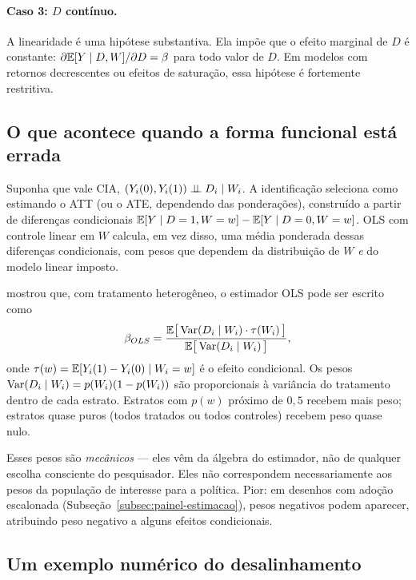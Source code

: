 \paragraph{Caso 3: $D$ contínuo.} A linearidade é uma hipótese substantiva. Ela impõe que o efeito marginal de $D$ é constante: $\partial \mathbb{E}[Y \mid D, W] / \partial D = \beta$ para todo valor de $D$. Em modelos com retornos decrescentes ou efeitos de saturação, essa hipótese é fortemente restritiva.

\subsection*{O que acontece quando a forma funcional está errada}

Suponha que vale CIA, $(Y_i(0), Y_i(1)) \perp\!\!\!\perp D_i \mid W_i$. A identificação seleciona como estimando o ATT (ou o ATE, dependendo das ponderações), construído a partir de diferenças condicionais $\mathbb{E}[Y \mid D=1, W=w] - \mathbb{E}[Y \mid D=0, W=w]$. OLS com controle linear em $W$ calcula, em vez disso, uma média ponderada dessas diferenças condicionais, com pesos que dependem da distribuição de $W$ \textit{e} do modelo linear imposto.

\citet{Angrist1998} mostrou que, com tratamento heterogêneo, o estimador OLS pode ser escrito como
\begin{equation}
\beta_{OLS} = \frac{\mathbb{E}\big[\,\mathrm{Var}(D_i \mid W_i) \cdot \tau(W_i)\,\big]}{\mathbb{E}\big[\,\mathrm{Var}(D_i \mid W_i)\,\big]},
\label{eq:angrist-pesos}
\end{equation}
onde $\tau(w) = \mathbb{E}[Y_i(1) - Y_i(0) \mid W_i = w]$ é o efeito condicional. Os pesos $\mathrm{Var}(D_i \mid W_i) = p(W_i)(1 - p(W_i))$ são proporcionais à variância do tratamento dentro de cada estrato. Estratos com $p(w)$ próximo de $0{,}5$ recebem mais peso; estratos quase puros (todos tratados ou todos controles) recebem peso quase nulo.

Esses pesos são \textit{mecânicos} --- eles vêm da álgebra do estimador, não de qualquer escolha consciente do pesquisador. Eles não correspondem necessariamente aos pesos da população de interesse para a política. Pior: em desenhos com adoção escalonada (Subseção~\ref{subsec:painel-estimacao}), pesos negativos podem aparecer, atribuindo peso negativo a alguns efeitos condicionais.

\subsection*{Um exemplo numérico do desalinhamento}

